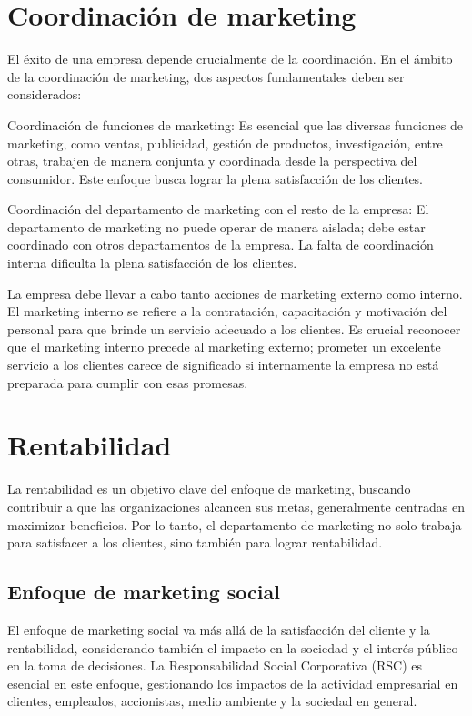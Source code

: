 \documentclass[
    a4paper, %
    10pt, %
    unnumberedsections, %
    twoside, %
]{LTJournalArticle}
\begin{document}
\section{Coordinación de marketing}

El éxito de una empresa depende crucialmente de la coordinación. En el ámbito de la coordinación de marketing, dos aspectos fundamentales deben ser considerados:

Coordinación de funciones de marketing: Es esencial que las diversas funciones de marketing, como ventas, publicidad, gestión de productos, investigación, entre otras, trabajen de manera conjunta y coordinada desde la perspectiva del consumidor. Este enfoque busca lograr la plena satisfacción de los clientes.

Coordinación del departamento de marketing con el resto de la empresa: El departamento de marketing no puede operar de manera aislada; debe estar coordinado con otros departamentos de la empresa. La falta de coordinación interna dificulta la plena satisfacción de los clientes.

La empresa debe llevar a cabo tanto acciones de marketing externo como interno. El marketing interno se refiere a la contratación, capacitación y motivación del personal para que brinde un servicio adecuado a los clientes. Es crucial reconocer que el marketing interno precede al marketing externo; prometer un excelente servicio a los clientes carece de significado si internamente la empresa no está preparada para cumplir con esas promesas.



\section{Rentabilidad}

La rentabilidad es un objetivo clave del enfoque de marketing, buscando contribuir a que las organizaciones alcancen sus metas, generalmente centradas en maximizar beneficios. Por lo tanto, el departamento de marketing no solo trabaja para satisfacer a los clientes, sino también para lograr rentabilidad.


\subsection{Enfoque de marketing social}

El enfoque de marketing social va más allá de la satisfacción del cliente y la rentabilidad, considerando también el impacto en la sociedad y el interés público en la toma de decisiones. La Responsabilidad Social Corporativa (RSC) es esencial en este enfoque, gestionando los impactos de la actividad empresarial en clientes, empleados, accionistas, medio ambiente y la sociedad en general.
\end{document}

